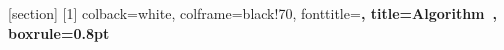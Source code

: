 [section]
[1]{
  colback=white, colframe=black!70,
  fonttitle=\bfseries,
  title={Algorithm~\thealgcounter\label{#1}},
  boxrule=0.8pt
}

\newcommand{\R}{\mathbb{R}}
\newcommand{\Rnn}{\R_{\geq 0}} %
\newcommand{\Rpos}{\R_{>0}}    %
\newcommand{\N}{\mathbb{N}}
\newcommand{\E}{\mathbb{E}}
\DeclareMathOperator*{\argmin}{arg\,min}
\DeclareMathOperator*{\argmax}{arg\,max}
\DeclareMathOperator{\diag}{diag}
\DeclareMathOperator{\tr}{tr}
\DeclareMathOperator{\KL}{KL}
\DeclareMathOperator{\Id}{Id}
\newcommand{\abs}[1]{\lvert #1 \rvert}
\newcommand{\norm}[1]{\lVert #1 \rVert}
\newcommand{\inner}[2]{\langle #1,\, #2 \rangle}
\newcommand{\defeq}{\overset{\mathrm{def}}{=}}

\newcommand{\Z}{\mathbb{Z}}
\newcommand{\Q}{\mathbb{Q}}

\newcommand{\X}{\mathcal{X}}
\newcommand{\Y}{\mathcal{Y}}
\newcommand{\Mm}{\mathcal{M}}
\newcommand{\Bb}{\mathcal{B}}
\newcommand{\Cc}{\mathcal{C}}

\newcommand{\simplex}{\Sigma}

\newcommand{\ones}{\mathbf{1}}
\newcommand{\Identity}{\mathbf{I}}

\newcommand{\supp}{\operatorname{supp}}
\renewcommand{\d}{\mathrm{d}}

\newcommand{\Couplings}{\mathcal{U}}
\newcommand{\CouplingsD}{\Pi}
\newcommand{\Wass}{\mathcal{W}}
\newcommand{\WassD}{\mathrm{W}}
\newcommand{\MK}{\mathcal{L}}
\newcommand{\MKD}{\mathrm{L}}
\DeclareMathOperator{\Perm}{Perm}
\DeclareMathOperator{\rank}{rank}
\newcommand{\pushforward}{_\sharp}
\newcommand{\PotentialsD}{\mathbf{R}}
\newcommand{\Potentials}{\mathcal{R}}
\newcommand{\Hb}{\mathrm{H}}
\newcommand{\KLD}{\mathrm{KL}}
\newcommand{\dist}{d}
\newcommand{\distD}{\mathbf{D}}

\usepackage{stmaryrd}
\newcommand{\range}[1]{\llbracket #1 \rrbracket}

\newcommand{\demohint}[1]{}

\usepackage[numbers,sort&compress]{natbib}
